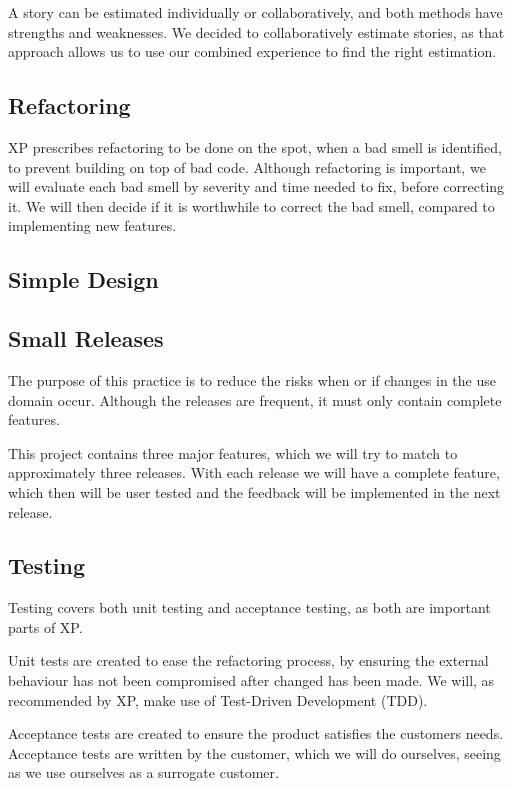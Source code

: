 A story can be estimated individually or collaboratively, and both methods have strengths and weaknesses.
We decided to collaboratively estimate stories, as that approach allows us to use our combined experience to find the right estimation.

\subsection{Refactoring}
XP prescribes refactoring to be done on the spot, when a bad smell is identified, to prevent building on top of bad code.
Although refactoring is important, we will evaluate each bad smell by severity and time needed to fix, before correcting it.
We will then decide if it is worthwhile to correct the bad smell, compared to implementing new features.

\subsection{Simple Design}

\subsection{Small Releases}
The purpose of this practice is to reduce the risks when or if changes in the use domain occur.
Although the releases are frequent, it must only contain complete features.

This project contains three major features, which we will try to match to approximately three releases.
With each release we will have a complete feature, which then will be user tested and the feedback will be implemented in the next release.

\subsection{Testing}
Testing covers both unit testing and acceptance testing, as both are important parts of XP.

Unit tests are created to ease the refactoring process, by ensuring the external behaviour has not been compromised after changed has been made.
We will, as recommended by XP, make use of Test-Driven Development (TDD).

Acceptance tests are created to ensure the product satisfies the customers needs.
Acceptance tests are written by the customer, which we will do ourselves, seeing as we use ourselves as a surrogate customer.

